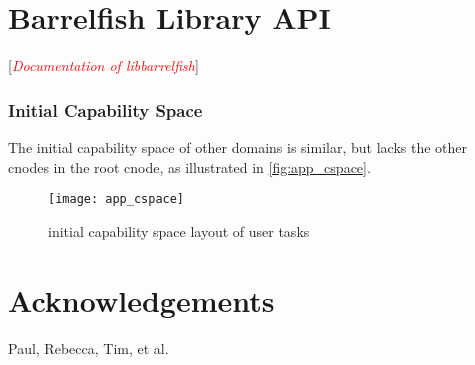 \documentclass[a4paper,11pt,twoside]{report}
\newcommand{\todo}[1]{[\textcolor{red}{\emph{#1}}]}
\begin{document}
\chapter{Barrelfish Library API}
\todo{Documentation of libbarrelfish}

\subsection{Initial Capability Space}

The initial capability space of other domains is similar, but lacks the other
cnodes in the root cnode, as illustrated in \autoref{fig:app_cspace}.

\begin{figure}
\centering
\texttt{[image: app\_cspace]}
\caption{initial capability space layout of user tasks}
\label{fig:app_cspace}
\end{figure}


\chapter*{Acknowledgements}
Paul, Rebecca, Tim, et al.




\end{document}

